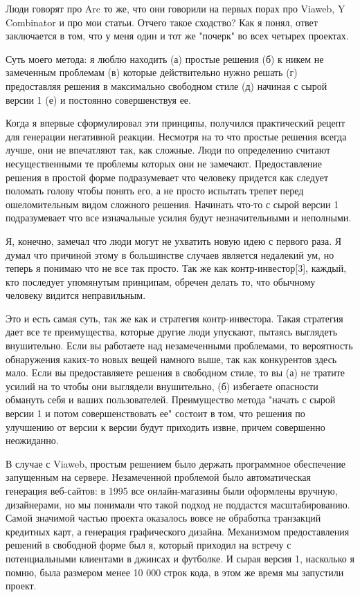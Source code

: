 \documentclass[ebook,12pt,oneside,openany]{memoir}
\begin{document}
Люди говорят про Arc то же, что они говорили на первых порах про
Viaweb, Y Combinator и про мои статьи. Отчего такое сходство? Как я
понял, ответ заключается в том, что у меня один и тот же "почерк" во
всех четырех проектах.

Суть моего метода: я люблю находить (а) простые решения (б) к никем не
замеченным проблемам (в) которые действительно нужно решать (г)
предоставляя решения в максимально свободном стиле (д) начиная с сырой
версии 1 (е) и постоянно совершенствуя ее.

Когда я впервые сформулировал эти принципы, получился практический
рецепт для генерации негативной реакции. Несмотря на то что простые
решения всегда лучше, они не впечатляют так, как сложные. Люди по
определению считают несущественными те проблемы которых они не
замечают. Предоставление решения в простой форме подразумевает что
человеку придется как следует поломать голову чтобы понять его, а не
просто испытать трепет перед ошеломительным видом сложного решения.
Начинать что-то с сырой версии 1 подразумевает что все изначальные
усилия будут незначительными и неполными.

Я, конечно, замечал что люди могут не ухватить новую идею с первого
раза. Я думал что причиной этому в большинстве случаев является
недалекий ум, но теперь я понимаю что не все так просто. Так же как
контр-инвестор[3], каждый, кто последует упомянутым принципам, обречен
делать то, что обычному человеку видится неправильным.

Это и есть самая суть, так же как и стратегия контр-инвестора. Такая
стратегия дает все те преимущества, которые другие люди упускают,
пытаясь выглядеть внушительно. Если вы работаете над незамеченными
проблемами, то вероятность обнаружения каких-то новых вещей намного
выше, так как конкурентов здесь мало. Если вы предоставляете решения в
свободном стиле, то вы (а) не тратите усилий на то чтобы они выглядели
внушительно, (б) избегаете опасности обмануть себя и ваших
пользователей. Преимущество метода "начать с сырой версии 1 и потом
совершенствовать ее" состоит в том, что решения по улучшению от версии
к версии будут приходить извне, причем совершенно неожиданно.

В случае с Viaweb, простым решением было держать программное
обеспечение запущенным на сервере. Незамеченной проблемой было
автоматическая генерация веб-сайтов: в 1995 все онлайн-магазины были
оформлены вручную, дизайнерами, но мы понимали что такой подход не
поддастся масштабированию. Самой значимой частью проекта оказалось
вовсе не обработка транзакций кредитных карт, а генерация графического
дизайна. Механизмом предоставления решений в свободной форме был я,
который приходил на встречу с потенциальными клиентами в джинсах и
футболке. И сырая версия 1, насколько я помню, была размером менее 10
000 строк кода, в этом же время мы запустили проект.
\end{document}
